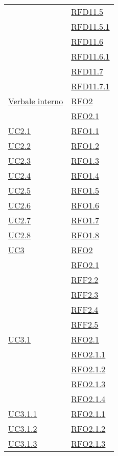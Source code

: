 \begin{longtable}{|>{\centering}m{5cm}|m{5cm}<{\centering}|}
& \hyperlink{RFD11.5}{RFD11.5}\\
& \hyperlink{RFD11.5.1}{RFD11.5.1}\\
& \hyperlink{RFD11.6}{RFD11.6}\\
& \hyperlink{RFD11.6.1}{RFD11.6.1}\\
& \hyperlink{RFD11.7}{RFD11.7}\\
& \hyperlink{RFD11.7.1}{RFD11.7.1}\\ \hline
\hyperlink{Verbale interno}{Verbale interno} & \hyperlink{RFO2}{RFO2}\\
& \hyperlink{RFO2.1}{RFO2.1}\\ \hline
\hyperref[UC2.1]{UC2.1} & \hyperlink{RFO1.1}{RFO1.1}\\ \hline
\hyperref[UC2.2]{UC2.2} & \hyperlink{RFO1.2}{RFO1.2}\\ \hline
\hyperref[UC2.3]{UC2.3} & \hyperlink{RFO1.3}{RFO1.3}\\ \hline
\hyperref[UC2.4]{UC2.4} & \hyperlink{RFO1.4}{RFO1.4}\\ \hline
\hyperref[UC2.5]{UC2.5} & \hyperlink{RFO1.5}{RFO1.5}\\ \hline
\hyperref[UC2.6]{UC2.6} & \hyperlink{RFO1.6}{RFO1.6}\\ \hline
\hyperref[UC2.7]{UC2.7} & \hyperlink{RFO1.7}{RFO1.7}\\ \hline
\hyperref[UC2.8]{UC2.8} & \hyperlink{RFO1.8}{RFO1.8}\\ \hline
\hyperref[UC3]{UC3} & \hyperlink{RFO2}{RFO2}\\
& \hyperlink{RFO2.1}{RFO2.1}\\
& \hyperlink{RFF2.2}{RFF2.2}\\
& \hyperlink{RFF2.3}{RFF2.3}\\
& \hyperlink{RFF2.4}{RFF2.4}\\
& \hyperlink{RFF2.5}{RFF2.5}\\ \hline
\hyperref[UC3.1]{UC3.1} & \hyperlink{RFO2.1}{RFO2.1}\\
& \hyperlink{RFO2.1.1}{RFO2.1.1}\\
& \hyperlink{RFO2.1.2}{RFO2.1.2}\\
& \hyperlink{RFO2.1.3}{RFO2.1.3}\\
& \hyperlink{RFO2.1.4}{RFO2.1.4}\\ \hline
\hyperref[UC3.1.1]{UC3.1.1} & \hyperlink{RFO2.1.1}{RFO2.1.1}\\ \hline
\hyperref[UC3.1.2]{UC3.1.2} & \hyperlink{RFO2.1.2}{RFO2.1.2}\\ \hline
\hyperref[UC3.1.3]{UC3.1.3} & \hyperlink{RFO2.1.3}{RFO2.1.3}\\ \hline

\end{longtable}
